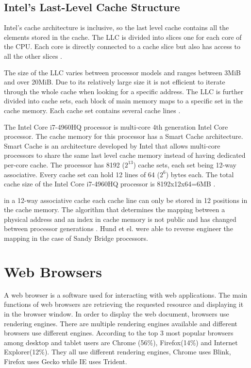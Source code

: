 \documentclass[10pt,a4paper,twoside]{book}
\begin{document}
\subsection{Intel's Last-Level Cache Structure}
Intel's cache architecture is inclusive, so the last level cache contains all the elements stored in the cache. The LLC is divided into slices one for each core of the CPU. Each core is directly connected to a cache slice but also has access to all the other slices \cite{oren2015spy}.

The size of the LLC varies between processor models and ranges between 3MiB and over 20MiB. Due to its relatively large size it is not efficient to iterate through the whole cache when looking for a specific address. The LLC is further divided into cache sets, each block of main memory maps to a specific set in the cache memory. Each cache set contains several cache lines \cite{oren2015spy}. 

The Intel Core i7-4960HQ processor is multi-core 4th generation Intel Core processor. The cache memory for this processor has a Smart Cache architecture. Smart Cache is an architecture developed by Intel that allows multi-core processors to share the same last level cache memory instead of having dedicated per-core cache. The processor has 8192 ($2^{13}$) cache sets, each set being 12-way associative. Every cache set can hold 12 lines of  64 ($2^6$) bytes each. The total cache size of the Intel Core i7-4960HQ processor is 8192x12x64=6MB \cite{oren2015spy}.

in a 12-way associative cache each cache line can only be stored in 12 positions in the cache memory. The algorithm that determines the mapping between a physical address and an index in cache memory is not public and has changed between processor generations \cite{oren2015spy}. Hund et el. \cite{hund2013practical} were able to reverse engineer the mapping in the case of Sandy Bridge processors.

\section{Web Browsers}

A web browser is a software used for interacting with web applications. The main functions of web browsers are retrieving the requested resource and displaying it in the browser window. In order to display the web document, browsers use rendering engines. There are multiple rendering engines available and different browsers use different engines. According to \cite{statcounter} the top 3 most popular browsers among desktop and tablet users are Chrome (56\%), Firefox(14\%) and Internet Explorer(12\%). They all use different rendering engines, Chrome uses Blink, Firefox uses Gecko while IE uses Trident\cite{howbrowserswork}.
\end{document}

